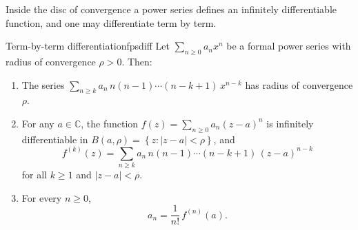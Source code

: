 \documentclass[11pt,openany]{report}
\newcommand{\C}{\mathbb{C}}
\newcommand{\abs}[1]{\left\lvert #1 \right\rvert}
\newcommand{\set}[1]{\left\{ #1 \right\}}
\begin{document}
Inside the disc of convergence a power series defines an infinitely differentiable
function, and one may differentiate term by term.

\begin{theorem}{Term-by-term differentiation}{fpsdiff}
Let $\sum_{n\ge0}a_n x^n$ be a formal power series with radius of convergence $\rho>0$.
Then:
\begin{enumerate}[label=\textup{(\arabic*)},leftmargin=2em]
  \item The series $\displaystyle\sum_{n\ge k} a_n\, n(n-1)\cdots(n-k+1)\,x^{n-k}$ has
        radius of convergence $\rho$.
  \item For any $a\in\C$, the function
        $f(z)=\displaystyle\sum_{n\ge0}a_n(z-a)^n$ is infinitely differentiable in
        $B(a,\rho)=\set{ z : \abs{z-a}<\rho }$, and
        \[
          f^{(k)}(z)=\sum_{n\ge k} a_n\, n(n-1)\cdots(n-k+1)\,(z-a)^{n-k}
        \]
        for all $k\ge1$ and $\abs{z-a}<\rho$.
  \item For every $n\ge0$,
        \[
          \boxed{\ a_n = \frac{1}{n!}\,f^{(n)}(a).\ }
        \]
\end{enumerate}
\end{theorem}
\end{document}
